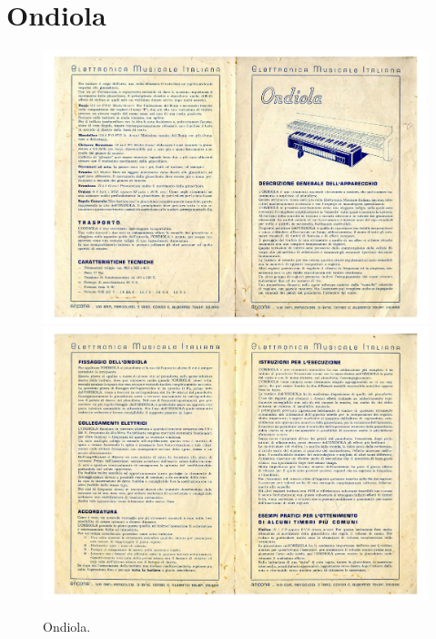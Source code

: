 \section{Ondiola}
\begin{figure}[H]
    \centering
    \includegraphics[width=.9\textwidth]{docs/ondiola-doc001-01.pdf}
    \includegraphics[width=.9\textwidth]{docs/ondiola-doc001-02.pdf}
    \caption{Ondiola.}
\end{figure}

